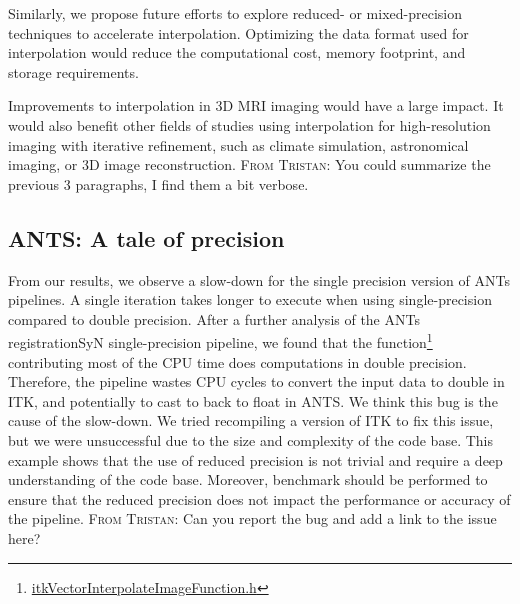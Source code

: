 \documentclass[conference]{IEEEtran}
\newcommand{\TG}[1]{\color{blue}\textsc{From Tristan: }#1\color{black}}
\begin{document}
Similarly, we propose future efforts to explore reduced- or mixed-precision techniques to accelerate interpolation. Optimizing the data format used for interpolation would reduce the computational cost, memory footprint, and storage requirements.

Improvements to interpolation in 3D MRI imaging would have a large impact. It would also benefit other fields of studies using interpolation for high-resolution imaging with iterative refinement, such as climate simulation, astronomical imaging, or 3D image reconstruction. \TG{You could summarize the previous 3 paragraphs, I find them a bit verbose.}

\subsection{ANTS: A tale of precision}
From our results, we observe a slow-down for the single precision version of ANTs pipelines. A single iteration takes longer to execute when using single-precision compared to double precision. After a further analysis of the ANTs registrationSyN single-precision pipeline, we found that the function\footnote{\href{https://github.com/InsightSoftwareConsortium/ITK/blob/d9c585d96359bf304ad3047148cee81bf27ac0c1/Modules/Core/ImageFunction/include/itkVectorInterpolateImageFunction.h\#L46-L48}{itkVectorInterpolateImageFunction.h}} contributing most of the CPU time does computations in double precision. Therefore, the pipeline wastes CPU cycles to convert the input data to double in ITK, and potentially to cast to back to float in ANTS. We think this bug is the cause of the slow-down. We tried recompiling a version of ITK to fix this issue, but we were unsuccessful due to the size and complexity of the code base. This example shows that the use of reduced precision is not trivial and require a deep understanding of the code base. Moreover, benchmark should be performed to ensure that the reduced precision does not impact the performance or accuracy of the pipeline. \TG{Can you report the bug and add a link to the issue here?}
\end{document}
